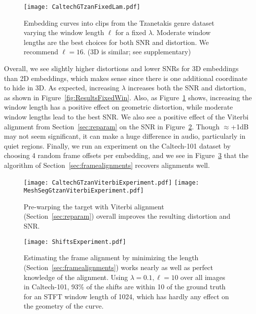 \documentclass[runningheads]{llncs}
\begin{document}
\begin{figure}
  \centering
  \texttt{[image: CaltechGTzanFixedLam.pdf]}
  \caption{Embedding curves into clips from the Tzanetakis genre dataset varying the window length $\ell$ for a fixed $\lambda$.  Moderate window lengths are the best choices for both SNR and distortion.  We recommend $\ell=16$. (3D is similar; see supplementary)}
  \label{fig:ResultsFixedLam}
\end{figure}

Overall, we see slightly higher distortions and lower SNRs for 3D embeddings than 2D embeddings, which makes sense since there is one additional coordinate to hide in 3D.  As expected, increasing $\lambda$ increases both the SNR and distortion, as shown in Figure~\ref{fig:ResultsFixedWin}. Also, as Figure~\ref{fig:ResultsFixedLam} shows, increasing the window length has a positive effect on geometric distortion, while moderate window lengths lead to the best SNR.  We also see a positive effect of the Viterbi alignment from Section~\ref{sec:reparam} on the SNR in Figure~\ref{fig:ResultsViterbiExperiment}.  Though $\approx$+1dB may not seem significant, it can make a huge difference in audio, particularly in quiet regions.  Finally, we run an experiment on the Caltech-101 dataset by choosing 4 random frame offsets per embedding, and we see in Figure~\ref{fig:ShiftsExperiment} that the algorithm of Section~\ref{sec:framealignments} recovers alignments well.  


\begin{figure}
  \centering
  \texttt{[image: CaltechGTzanViterbiExperiment.pdf]}
  \texttt{[image: MeshSegGtzanViterbiExperiment.pdf]}
  \caption{Pre-warping the target with Viterbi alignment (Section~\ref{sec:reparam}) overall improves the resulting distortion and SNR.}
  \label{fig:ResultsViterbiExperiment}
\end{figure}

\begin{figure}
  \centering
  \texttt{[image: ShiftsExperiment.pdf]}
  \caption{Estimating the frame alignment by minimizing the length (Section~\ref{sec:framealignments}) works nearly as well as perfect knowledge of the alignment. Using $\lambda=0.1, \ell=10$ over all images in Caltech-101, 93\% of the shifts are within 10 of the ground truth for an STFT window length of 1024, which has hardly any effect on the geometry of the curve.}
  \label{fig:ShiftsExperiment}
\end{figure}
\end{document}

